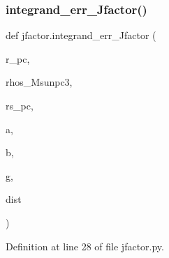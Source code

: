 \subsubsection{\texorpdfstring{integrand\+\_\+err\+\_\+\+Jfactor()}{integrand\_err\_Jfactor()}}
{\footnotesize\ttfamily def jfactor.\+integrand\+\_\+err\+\_\+\+Jfactor (\begin{DoxyParamCaption}\item[{}]{r\+\_\+pc,  }\item[{}]{rhos\+\_\+\+Msunpc3,  }\item[{}]{rs\+\_\+pc,  }\item[{}]{a,  }\item[{}]{b,  }\item[{}]{g,  }\item[{}]{dist }\end{DoxyParamCaption})}



Definition at line 28 of file jfactor.\+py.


